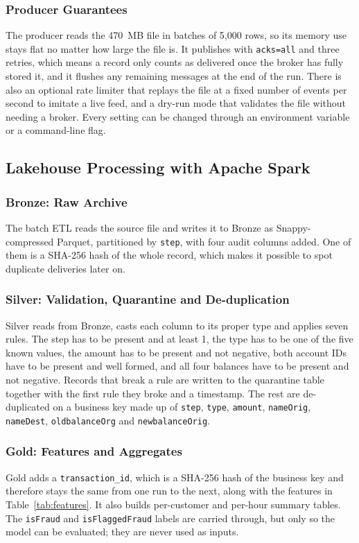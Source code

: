\documentclass[11pt,a4paper]{article}
\newcommand{\code}[1]{\texttt{#1}}
\begin{document}
\subsubsection{Producer Guarantees}
The producer reads the 470~MB file in batches of 5,000 rows, so its memory use
stays flat no matter how large the file is. It publishes with \code{acks=all} and
three retries, which means a record only counts as delivered once the broker has
fully stored it, and it flushes any remaining messages at the end of the run.
There is also an optional rate limiter that replays the file at a fixed number of
events per second to imitate a live feed, and a dry-run mode that validates the
file without needing a broker. Every setting can be changed through an
environment variable or a command-line flag.

\subsection{Lakehouse Processing with Apache Spark}

\subsubsection{Bronze: Raw Archive}
The batch ETL reads the source file and writes it to Bronze as Snappy-compressed
Parquet, partitioned by \code{step}, with four audit columns added. One of them is
a SHA-256 hash of the whole record, which makes it possible to spot duplicate
deliveries later on.

\subsubsection{Silver: Validation, Quarantine and De-duplication}
Silver reads from Bronze, casts each column to its proper type and applies seven
rules. The step has to be present and at least 1, the type has to be one of the
five known values, the amount has to be present and not negative, both account
IDs have to be present and well formed, and all four balances have to be present
and not negative. Records that break a rule are written to the quarantine table
together with the first rule they broke and a timestamp. The rest are
de-duplicated on a business key made up of \code{step}, \code{type},
\code{amount}, \code{nameOrig}, \code{nameDest}, \code{oldbalanceOrg} and
\code{newbalanceOrig}.

\subsubsection{Gold: Features and Aggregates}
Gold adds a \code{transaction\_id}, which is a SHA-256 hash of the business key
and therefore stays the same from one run to the next, along with the features in
Table~\ref{tab:features}. It also builds per-customer and per-hour summary
tables. The \code{isFraud} and \code{isFlaggedFraud} labels are carried through,
but only so the model can be evaluated; they are never used as inputs.
\end{document}
